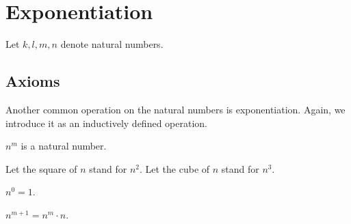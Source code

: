 \documentclass[../../arithmetic.ftl.tex]{subfiles}
\begin{document}
  \begin{comment}
    \begin{forthel}

    \end{forthel}
  \end{comment}


  \section{Exponentiation}

  \begin{forthel}
  \end{forthel}

  \begin{forthel}
    Let $k, l, m, n$ denote natural numbers.
  \end{forthel}


  \subsection{Axioms}

  Another common operation on the natural numbers is exponentiation.
  Again, we introduce it as an inductively defined operation.

  \begin{forthel}
    \begin{signature}
      $n^{m}$ is a natural number.
    \end{signature}

    Let the square of $n$ stand for $n^{2}$.
    Let the cube of $n$ stand for $n^{3}$.

    \begin{axiom}\label{Arithmetic_01_04_316593}
      $n^{0} = 1$.
    \end{axiom}

    \begin{axiom}\label{Arithmetic_01_04_312242}
      $n^{m + 1} = n^{m} \cdot n$.
    \end{axiom}
  \end{forthel}
\end{document}
